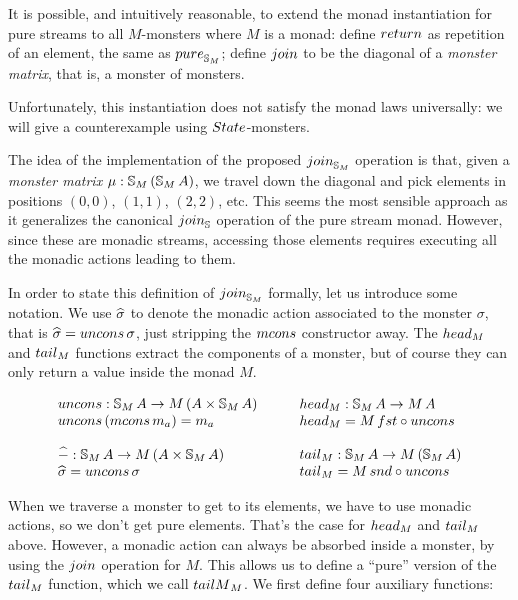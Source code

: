 It is possible, and intuitively reasonable, to extend the monad instantiation for pure streams to all $M$-monsters where $M$ is a monad:
define $\return$ as repetition of an element, the same as $\apure_{\stream{M}}$;
define $\join$ to be the diagonal of a {\em monster matrix}, that is, a monster of monsters.

Unfortunately, this instantiation does not satisfy the monad laws universally: we will give a counterexample using $\state$-monsters.

The idea of the implementation of the proposed $\join_{\stream{M}}$ operation is that,
given a {\em monster matrix} $\mu:\mathbb{S}_{M}\,(\mathbb{S}_{M}\,A)$, we travel down the diagonal and pick elements in positions $(0,0)$, $(1,1)$, $(2,2)$, etc.
This seems the most sensible approach as it generalizes the canonical $\join_\strsym$ operation of the pure stream monad.
However, since these are monadic streams, accessing those elements requires executing all the monadic actions leading to them.

In order to state this definition of $\join_{\stream{M}}$ formally, let us introduce some notation.
We use $\widehat{\sigma}$ to denote the monadic action associated to the monster $\sigma$, that is $ \unc{\sigma} = \uncons\,\sigma $, just stripping the $\mcons$ constructor away.
The $\head_M$ and $\tail_M$ functions extract the components of a monster, but of course they can only return a value inside the monad $M$.

$$
\begin{array}{l}
\uncons : \stream{M}\,A \rightarrow M\,(A \times \stream{M}\,A)\\
\uncons\, (\mcons\, m_a) = m_a \\
\,\\
\unc{-} : \stream{M}\,A \rightarrow M\,(A\times \stream{M}\,A)\\
\unc{\sigma} = \uncons\,\sigma
\end{array}
\qquad
\begin{array}{l}
\head_M : \stream{M}\,A \rightarrow M\,A\\
\head_M = M\,\fst \comp \uncons\\
\,\\
\tail_M : \stream{M}\,A \rightarrow M\,(\stream{M}\,A)\\
\tail_M = M\,\snd \comp \uncons\\
\end{array}
$$

When we traverse a monster to get to its elements, we have to use monadic actions, so we don't get pure elements.
That's the case for $\head_M$ and $\tail_M$ above.
However, a monadic action can always be absorbed inside a monster, by using the $\join$ operation for $M$.
This allows us to define a ``pure'' version of the $\tail_M$ function, which we call $\tailm_M$.
We first define four auxiliary functions:

